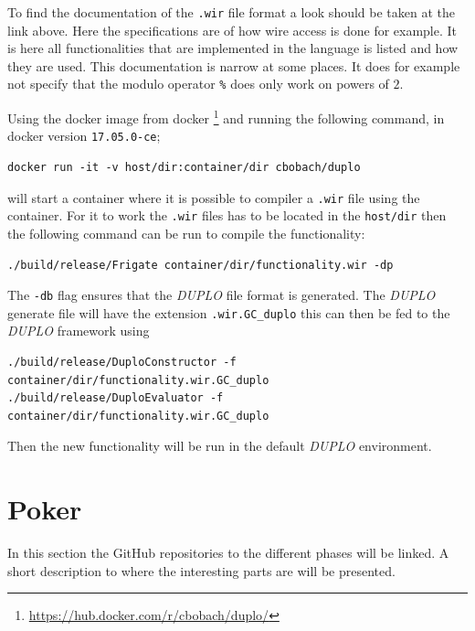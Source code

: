 \documentclass[twoside,11pt,openright]{report}
\newcommand{\DUPLO}{\textit{DUPLO} }
\begin{document}
\begin{appendices}
To find the documentation of the \verb|.wir| file format a look should be taken at the link above. Here the specifications are of how wire access is done for example. It is here all functionalities that are implemented in the language is listed and how they are used. This documentation is narrow at some places. It does for example not specify that the modulo operator \verb|%| does only work on powers of $2$.

\bigskip

Using the docker image from docker \footnote{\url{https://hub.docker.com/r/cbobach/duplo/}} and running the following command, in docker version \verb|17.05.0-ce|;

\begin{center}
\begin{verbatim}
docker run -it -v host/dir:container/dir cbobach/duplo
\end{verbatim}
\end{center}

will start a container where it is possible to compiler a \verb|.wir| file using the container. For it to work the \verb|.wir| files has to be located in the \verb|host/dir| then the following command can be run to compile the functionality:

\begin{center}
\begin{verbatim}
./build/release/Frigate container/dir/functionality.wir -dp
\end{verbatim}
\end{center}

The \verb|-db| flag ensures that the \DUPLO file format is generated. The \DUPLO generate file will have the extension \verb|.wir.GC_duplo| this can then be fed to the \DUPLO framework using

\begin{center}
\begin{verbatim}
./build/release/DuploConstructor -f container/dir/functionality.wir.GC_duplo
./build/release/DuploEvaluator -f container/dir/functionality.wir.GC_duplo
\end{verbatim}
\end{center}

Then the new functionality will be run in the default \DUPLO environment.

\section{Poker}
\label{app:poker}
In this section the GitHub repositories to the different phases will be linked. A short description to where the interesting parts are will be presented.


\end{appendices}
\end{document}
